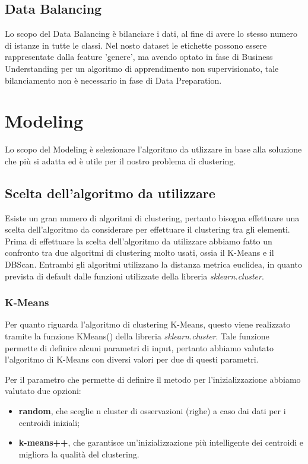 \documentclass[a4paper, 10pt]{report}
\begin{document}
        \section{Data Balancing}\label{sec:data-balancing}
            Lo scopo del Data Balancing è bilanciare i dati, al fine di avere lo stesso numero di istanze in tutte le classi.
            Nel nosto dataset le etichette possono essere rappresentate dalla feature 'genere', ma avendo optato in fase di
            Business Understanding per un algoritmo di apprendimento non supervisionato, tale bilanciamento non è necessario
            in fase di Data Preparation.


    \chapter{Modeling}\label{ch:modeling}

        Lo scopo del Modeling è selezionare l'algoritmo da utlizzare in base alla soluzione che più si adatta ed è utile per
        il nostro problema di clustering.

        \section{Scelta dell'algoritmo da utilizzare}\label{sec:scelta-dell'algoritmo-da-utilizzare}
            Esiste un gran numero di algoritmi di clustering, pertanto bisogna effettuare una scelta dell'algoritmo da considerare
            per effettuare il clustering tra gli elementi.
            Prima di effettuare la scelta dell'algoritmo da utilizzare abbiamo fatto un confronto tra due algoritmi di clustering molto
            usati, ossia il K-Means e il DBScan.
            Entrambi gli algoritmi utilizzano la distanza metrica euclidea, in quanto prevista di default dalle funzioni utilizzate della
            libreria \textit{sklearn.cluster}.

            \subsection{K-Means}
                Per quanto riguarda l'algoritmo di clustering K-Means, questo viene realizzato tramite la funzione KMeans()
                della libreria \textit{sklearn.cluster}.
                Tale funzione permette di definire alcuni parametri di input, pertanto abbiamo valutato l'algoritmo di K-Means
                con diversi valori per due di questi parametri.

                Per il parametro che permette di definire il metodo per l'inizializzazione abbiamo valutato due opzioni:
                    \begin{itemize}
                        \item \textbf{random}, che sceglie n cluster di osservazioni (righe) a caso dai dati per i centroidi iniziali;
                        \item \textbf{k-means++}, che garantisce un'inizializzazione più intelligente dei centroidi e migliora la qualità del clustering.
                    \end{itemize}
\end{document}
